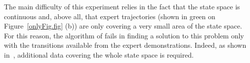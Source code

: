 \documentclass[tablecaption=bottom]{jmlr}
\begin{document}
The main difficulty of this experiment relies in the fact that the
state space is continuous and, above all, that expert trajectories
(shown in green on Figure~\ref{onlyFig.fig} (b)) are only covering a
very small area of the state space.
%
For this reason, the algorithm of \citet{abbeel2004apprenticeship}
fails in finding a solution to this problem only with the
transitions available from the expert demonstrations. Indeed, as
shown in~\citep{klein2011batch}, additional data covering the whole
state space is required.
%
\end{document}
